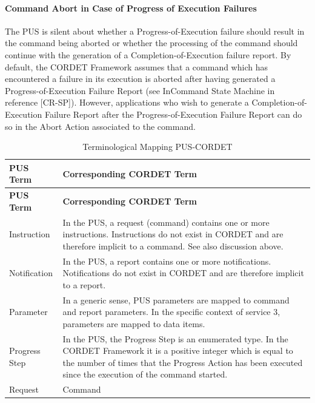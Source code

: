 \documentclass[a4paper,10pt]{article}
\begin{document}
\paragraph{Command Abort in Case of Progress of Execution Failures}
The PUS is silent about whether a Progress-of-Execution failure should result in the command being aborted or whether the processing of the command should continue with the generation of a Completion-of-Execution failure report. By default, the CORDET Framework assumes that a command which has encountered a failure in its execution is aborted after having generated a Progress-of-Execution Failure Report (see InCommand State Machine in reference [CR-SP]). However, applications who wish to generate a Completion-of-Execution Failure Report after the Progress-of-Execution Failure Report can do so in the Abort Action associated to the command. 


\begin{longtable}{|l|>{\raggedright\arraybackslash}p{10cm}|}
\caption{Terminological Mapping PUS-CORDET}\label{tab:termPusCr} \\
\hline
\rowcolor{light-gray}
\textbf{PUS Term} & \textbf{Corresponding CORDET Term} \\
\hline\hline
\endfirsthead
\rowcolor{light-gray}
\textbf{PUS Term} & \textbf{Corresponding CORDET Term} \\
\hline\hline
\endhead
Instruction & In the PUS, a request (command) contains one or more instructions. Instructions do not exist in CORDET and are therefore implicit to a command. See also discussion above. \\
\hline
Notification & In the PUS, a report contains one or more notifications. Notifications do not exist in CORDET and are therefore implicit to a report. \\
\hline
Parameter & In a generic sense, PUS parameters are mapped to command and report parameters. In the specific context of service 3, parameters are mapped to data items. \\
\hline
Progress Step & In the PUS, the Progress Step is an enumerated type. In the CORDET Framework it is a positive integer which is equal to the number of times that the Progress Action has been executed since the execution of the command started. \\
\hline
Request & Command \\
\hline
\end{longtable} 


\end{document}
